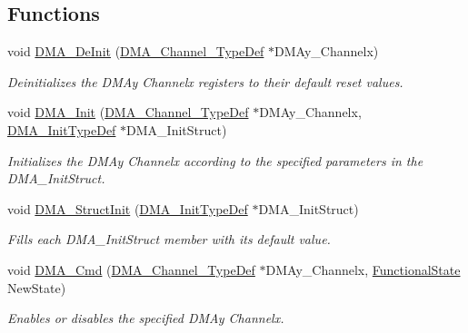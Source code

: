 \subsection*{Functions}
\begin{DoxyCompactItemize}
\item 
void \hyperlink{group___d_m_a___private___functions_ga21ca0d50b13e502db5ab5feb484f9ece}{D\+M\+A\+\_\+\+De\+Init} (\hyperlink{struct_d_m_a___channel___type_def}{D\+M\+A\+\_\+\+Channel\+\_\+\+Type\+Def} $\ast$D\+M\+Ay\+\_\+\+Channelx)
\begin{DoxyCompactList}\small\item\em Deinitializes the D\+M\+Ay Channelx registers to their default reset values. \end{DoxyCompactList}\item 
void \hyperlink{group___d_m_a___private___functions_ga7c3d1b9dc041f8e5f2cfc8d5dd858278}{D\+M\+A\+\_\+\+Init} (\hyperlink{struct_d_m_a___channel___type_def}{D\+M\+A\+\_\+\+Channel\+\_\+\+Type\+Def} $\ast$D\+M\+Ay\+\_\+\+Channelx, \hyperlink{struct_d_m_a___init_type_def}{D\+M\+A\+\_\+\+Init\+Type\+Def} $\ast$D\+M\+A\+\_\+\+Init\+Struct)
\begin{DoxyCompactList}\small\item\em Initializes the D\+M\+Ay Channelx according to the specified parameters in the D\+M\+A\+\_\+\+Init\+Struct. \end{DoxyCompactList}\item 
void \hyperlink{group___d_m_a___private___functions_ga0f7f95f750a90a6824f4e9b6f58adc7e}{D\+M\+A\+\_\+\+Struct\+Init} (\hyperlink{struct_d_m_a___init_type_def}{D\+M\+A\+\_\+\+Init\+Type\+Def} $\ast$D\+M\+A\+\_\+\+Init\+Struct)
\begin{DoxyCompactList}\small\item\em Fills each D\+M\+A\+\_\+\+Init\+Struct member with its default value. \end{DoxyCompactList}\item 
void \hyperlink{group___d_m_a___private___functions_ga8e7cb6b9ae5f142e2961df879cdaba65}{D\+M\+A\+\_\+\+Cmd} (\hyperlink{struct_d_m_a___channel___type_def}{D\+M\+A\+\_\+\+Channel\+\_\+\+Type\+Def} $\ast$D\+M\+Ay\+\_\+\+Channelx, \hyperlink{group___exported__types_gac9a7e9a35d2513ec15c3b537aaa4fba1}{Functional\+State} New\+State)
\begin{DoxyCompactList}\small\item\em Enables or disables the specified D\+M\+Ay Channelx. \end{DoxyCompactList}\item 

\end{DoxyCompactItemize}
